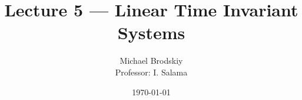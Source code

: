 


\title{Lecture 5 — Linear Time Invariant Systems}
\date{\today}
\author{Michael Brodskiy\\ \small Professor: I. Salama}



\maketitle

